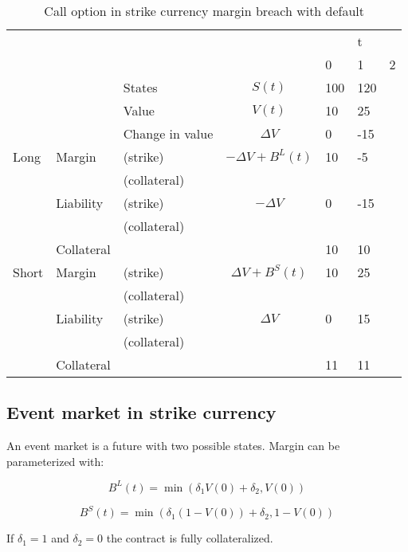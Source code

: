 \documentclass[12pt]{article}
\begin{document}
\begin{table}
\begin{tabular}{lll|c|lll}
&  &  &  &  & t &\\  
&  &  &  & 0 & 1 & 2\\
\hline
&  & States &  $S(t)$ & 100 & 120 & \\
&  & Value  &  $V(t)$  & 10 & 25 &  \\
&  & Change in value & $\Delta V$ & 0& -15 &  \\
\hline
\hline
Long      & Margin    & (strike)     & $-\Delta V + B^L(t)$& 10 & -5 & \\
          &           & (collateral) & & & &\\ 
          & Liability & (strike)     & $-\Delta V$ & 0 & -15 & \\ 
          &           & (collateral)& & & &\\
          & Collateral&                       &    & 10 & 10 & \\
\hline          
Short     & Margin    & (strike)     & $\Delta V + B^S(t)$ & 10 & 25 & \\
          &           & (collateral) & & & &\\
          & Liability & (strike)     & $\Delta V$ & 0 & 15 &\\
          &           & (collateral) & & & &\\
          & Collateral&                       &    & 11 & 11 & \\ 
          

\end{tabular}
\caption{Call option in strike currency margin breach with default}
\label{fut}
\end{table}

\subsection{Event market in strike currency}

An event market is a future with two possible states. Margin can be parameterized with:


\[ B^L(t) = \min(\delta_1 V(0) + \delta_2, V(0) ) \]

\[ B^S(t) = \min(\delta_1 (1-V(0)) + \delta_2, 1-V(0) ) \]

If $\delta_1=1$ and $\delta_2=0$ the contract is fully collateralized.
\end{document}

